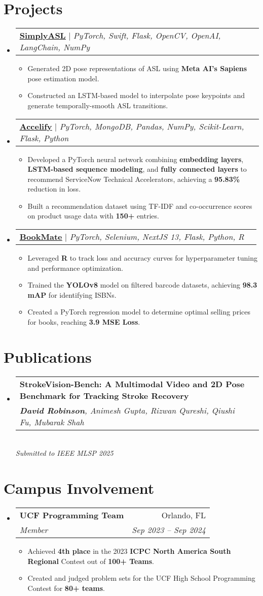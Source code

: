 \documentclass[letterpaper,11pt]{article}
\makeatletter
\newcommand{\resumeItem}[1]{
  \item\small{
    {#1 \vspace{-2pt}}
  }
}
\newcommand{\resumeSubheading}[4]{
  \vspace{-2pt}\item
    \begin{tabular*}{0.97\textwidth}[t]{l@{\extracolsep{\fill}}r}
      \textbf{#1} & #2 \\
      \textit{\small#3} & \textit{\small #4} \\
    \end{tabular*}\vspace{-7pt}
}
\newcommand{\resumeProjectHeading}[2]{
    \item
    \begin{tabular*}{0.97\textwidth}{l@{\extracolsep{\fill}}r}
      \small#1 & #2 \\
    \end{tabular*}\vspace{-7pt}
}
\newcommand{\resumeSubHeadingListStart}{\begin{itemize}[leftmargin=0.15in, label={}]}
\newcommand{\resumeSubHeadingListEnd}{\end{itemize}}
\newcommand{\resumeItemListStart}{\begin{itemize}}
\newcommand{\resumeItemListEnd}{\end{itemize}\vspace{-5pt}}
\makeatother
\begin{document}
\section{Projects}
  \resumeSubHeadingListStart
    \resumeProjectHeading
      {\href{https://github.com/DRobinson4105/Simply-ASL}{\textbf{\uline{SimplyASL}}} $|$ \emph{PyTorch, Swift, Flask, OpenCV, OpenAI, LangChain, NumPy}}{}
      \resumeItemListStart
        \resumeItem{Generated 2D pose representations of ASL using \textbf{Meta AI’s Sapiens} pose estimation model.}
        \resumeItem{Constructed an LSTM-based model to interpolate pose keypoints and generate temporally-smooth ASL transitions.}
      \resumeItemListEnd
    \resumeProjectHeading
      {\href{https://github.com/DRobinson4105/accelify}{\textbf{\uline{Accelify}}} $|$ \emph{PyTorch, MongoDB, Pandas, NumPy, Scikit-Learn, Flask, Python}}{}
      \resumeItemListStart
        \resumeItem{Developed a PyTorch neural network combining \textbf{embedding layers}, \textbf{LSTM-based sequence modeling}, and \textbf{fully connected layers} to recommend ServiceNow Technical Accelerators, achieving a \textbf{95.83\%} reduction in loss.}
        \resumeItem{Built a recommendation dataset using TF-IDF and co-occurrence scores on product usage data with \textbf{150+} entries.}
      \resumeItemListEnd
    \resumeProjectHeading
      {\href{https://github.com/DRobinson4105/bookmate}{\textbf{\uline{BookMate}}} $|$ \emph{PyTorch, Selenium, NextJS 13, Flask, Python, R}}{}
      \resumeItemListStart
        \resumeItem{Leveraged \textbf{R} to track loss and accuracy curves for hyperparameter tuning and performance optimization.}
        \resumeItem{Trained the \textbf{YOLOv8} model on filtered barcode datasets, achieving \textbf{98.3 mAP} for identifying ISBNs.}
        \resumeItem{Created a PyTorch regression model to determine optimal selling prices for books, reaching \textbf{3.9 MSE Loss}.}
      \resumeItemListEnd
  \resumeSubHeadingListEnd
\section{Publications}
\resumeSubHeadingListStart
  \resumeSubheading
    {StrokeVision-Bench: A Multimodal Video and 2D Pose Benchmark for Tracking Stroke Recovery}{} 
    {\textbf{David Robinson}, Animesh Gupta, Rizwan Qureshi, Qiushi Fu, Mubarak Shah}{} \\
    \vspace{0.75em}
    \textit{Submitted to IEEE MLSP 2025}
\resumeSubHeadingListEnd

\section{Campus Involvement}
  \resumeSubHeadingListStart
    \resumeSubheading
      {UCF Programming Team}{Orlando, FL}
      {Member}{Sep 2023 -- Sep 2024}
      \resumeItemListStart
        \resumeItem{Achieved \textbf{4th place} in the 2023 \textbf{ICPC North America South Regional} Contest out of \textbf{100+ Teams}.}
        \resumeItem{Created and judged problem sets for the UCF High School Programming Contest for \textbf{80+ teams}.}
      \resumeItemListEnd
  \resumeSubHeadingListEnd
\end{document}
